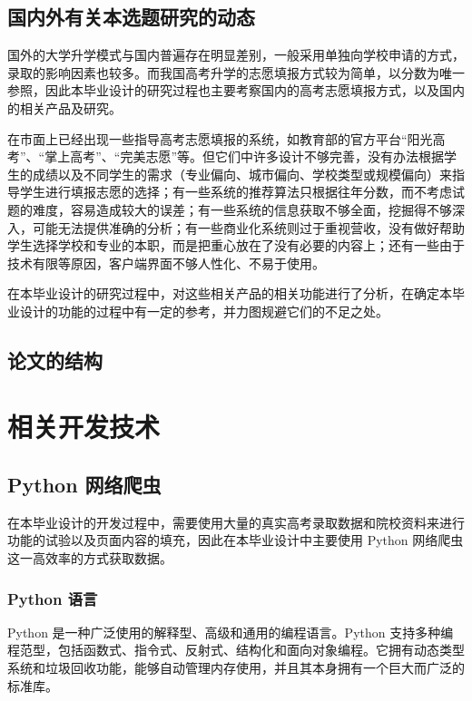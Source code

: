 \documentclass[a4paper,AutoFakeBold,oneside,12pt]{book}
\begin{document}
\section{国内外有关本选题研究的动态}
国外的大学升学模式与国内普遍存在明显差别，一般采用单独向学校申请的方式，录取的影响因素也较多。而我国高考升学的志愿填报方式较为简单，以分数为唯一参照，因此本毕业设计的研究过程也主要考察国内的高考志愿填报方式，以及国内的相关产品及研究。

在市面上已经出现一些指导高考志愿填报的系统，如教育部的官方平台“阳光高考”、“掌上高考”、“完美志愿”等。但它们中许多设计不够完善，没有办法根据学生的成绩以及不同学生的需求（专业偏向、城市偏向、学校类型或规模偏向）来指导学生进行填报志愿的选择；有一些系统的推荐算法只根据往年分数，而不考虑试题的难度，容易造成较大的误差；有一些系统的信息获取不够全面，挖掘得不够深入，可能无法提供准确的分析；有一些商业化系统则过于重视营收，没有做好帮助学生选择学校和专业的本职，而是把重心放在了没有必要的内容上；还有一些由于技术有限等原因，客户端界面不够人性化、不易于使用。

在本毕业设计的研究过程中，对这些相关产品的相关功能进行了分析，在确定本毕业设计的功能的过程中有一定的参考，并力图规避它们的不足之处。


\section{论文的结构}




\chapter{相关开发技术}

\section{Python 网络爬虫}
在本毕业设计的开发过程中，需要使用大量的真实高考录取数据和院校资料来进行功能的试验以及页面内容的填充，因此在本毕业设计中主要使用 Python 网络爬虫这一高效率的方式获取数据。

\subsection{Python 语言}
Python 是一种广泛使用的解释型、高级和通用的编程语言。Python 支持多种编程范型，包括函数式、指令式、反射式、结构化和面向对象编程。它拥有动态类型系统和垃圾回收功能，能够自动管理内存使用，并且其本身拥有一个巨大而广泛的标准库。\cite{python_wikipedia}\cite{python_about}
\end{document}

